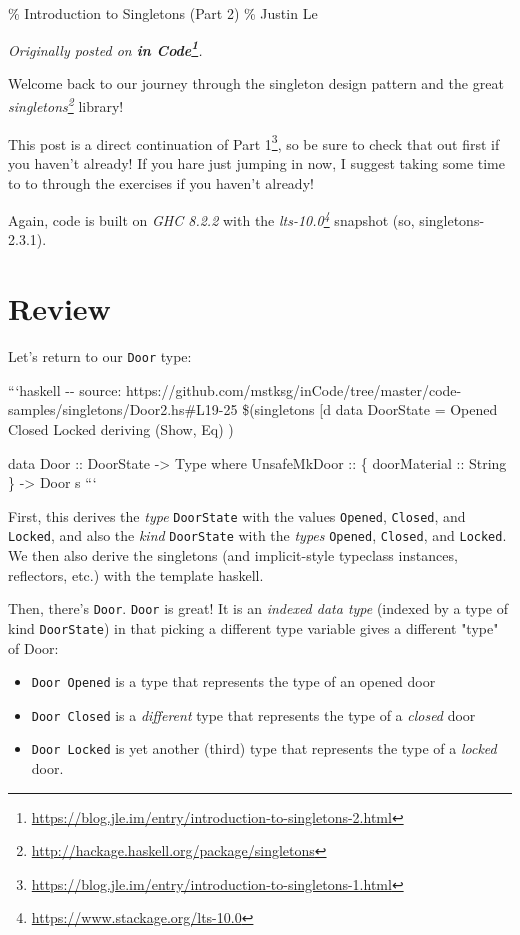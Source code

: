 \documentclass[]{article}
\renewcommand{\href}[2]{#2\footnote{\url{#1}}}
\begin{document}
\% Introduction to Singletons (Part 2) \% Justin Le

\emph{Originally posted on
\textbf{\href{https://blog.jle.im/entry/introduction-to-singletons-2.html}{in
Code}}.}

Welcome back to our journey through the singleton design pattern and the great
\emph{\href{http://hackage.haskell.org/package/singletons}{singletons}} library!

This post is a direct continuation of
\href{https://blog.jle.im/entry/introduction-to-singletons-1.html}{Part 1}, so
be sure to check that out first if you haven't already! If you hare just jumping
in now, I suggest taking some time to to through the exercises if you haven't
already!

Again, code is built on \emph{GHC 8.2.2} with the
\emph{\href{https://www.stackage.org/lts-10.0}{lts-10.0}} snapshot (so,
singletons-2.3.1).

\section{Review}

Let's return to our \texttt{Door} type:

```haskell -\/- source:
https://github.com/mstksg/inCode/tree/master/code-samples/singletons/Door2.hs\#L19-25
\$(singletons {[}d\textbar{} data DoorState = Opened \textbar{} Closed
\textbar{} Locked deriving (Show, Eq) \textbar{}{]})

data Door :: DoorState -\textgreater{} Type where UnsafeMkDoor :: \{
doorMaterial :: String \} -\textgreater{} Door s ```

First, this derives the \emph{type} \texttt{DoorState} with the values
\texttt{Opened}, \texttt{Closed}, and \texttt{Locked}, and also the \emph{kind}
\texttt{DoorState} with the \emph{types} \texttt{\textquotesingle{}Opened},
\texttt{\textquotesingle{}Closed}, and \texttt{\textquotesingle{}Locked}. We
then also derive the singletons (and implicit-style typeclass instances,
reflectors, etc.) with the template haskell.

Then, there's \texttt{Door}. \texttt{Door} is great! It is an \emph{indexed data
type} (indexed by a type of kind \texttt{DoorState}) in that picking a different
type variable gives a different "type" of Door:

\begin{itemize}
\tightlist
\item
  \texttt{Door\ \textquotesingle{}Opened} is a type that represents the type of
  an opened door
\item
  \texttt{Door\ \textquotesingle{}Closed} is a \emph{different} type that
  represents the type of a \emph{closed} door
\item
  \texttt{Door\ \textquotesingle{}Locked} is yet another (third) type that
  represents the type of a \emph{locked} door.
\end{itemize}
\end{document}
